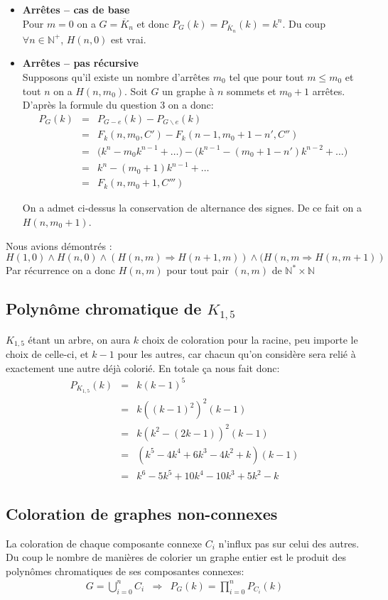 \begin{itemize}
\item \textbf{Arrêtes -- cas de base} \\
Pour $m = 0$ on a $G = \overline{K}_n$ et donc $P_G(k) = P_{\overline{K}_n}(k) = k^n$. Du coup $\forall n \in \mathbb{N^+}$, $H(n,0)$ est vrai.
\item \textbf{Arrêtes -- pas récursive} \\
Supposons qu'il existe un nombre d'arrêtes $m_0$ tel que pour tout $m \leq m_0$ et tout $n$ on a $H(n,m_0)$. Soit $G$ un graphe à $n$ sommets et $m_0 + 1$ arrêtes. D'après la formule du question $3$ on a donc:
\begin{eqnarray*}
P_G(k) &=& P_{G-e}(k) - P_{G \backslash e}(k)	\\
		&=& F_k(n,m_0,C') - F_k(n-1,m_0+1-n',C'')	\\
		&=& \Big( k^n - m_0k^{n-1} + \ldots \Big) - \Big( k^{n-1} - (m_0+1-n')k^{n-2} + \ldots \Big) 	\\
		&=& k^n - (m_0+1)k^{n-1} + \ldots	\\
		&=& F_k(n, m_0+1, C''')									
\end{eqnarray*}

On a admet ci-dessus la conservation de alternance des signes. De ce fait on a $H(n,m_0+1)$.
\end {itemize}
Nous avions démontrés :
\[ H(1,0) \wedge H(n,0) \wedge (H(n,m) \Rightarrow H(n+1,m)) \wedge (H(n,m \Rightarrow H(n,m+1)) \]
Par récurrence on a donc $H(n,m)$ pour tout pair $(n,m)$ de $\mathbb{N}^*\times{\mathbb{N}}$

\subsection{Polynôme chromatique de $K_{1,5}$}
$K_{1,5}$ étant un arbre, on aura $k$ choix de coloration pour la racine, peu importe le choix de celle-ci, et $k-1$ pour les autres, car chacun qu'on considère sera relié à exactement une autre déjà colorié. En totale ça nous fait donc:
\begin{eqnarray*}
P_{K_{1,5}}(k) 	& = & k(k-1)^5 \\
				& = & k{((k-1)^2)}^2(k-1)	\\
				& = & k(k^2 - (2k - 1))^2(k-1)	\\
				& = & (k^5 - 4k^4  + 6k^3 - 4k^2 + k)(k-1)  \\
				& = & k^6 - 5k^5  + 10k^4 - 10k^3 + 5k^2 - k	 
\end{eqnarray*}

\subsection{Coloration de graphes non-connexes}
La coloration de chaque composante connexe $C_i$ n'influx pas sur celui des autres. Du coup le nombre de manières de colorier un graphe entier est le produit des polynômes chromatiques de ses composantes connexes:
\begin{eqnarray*}
G = \bigcup_{i=0}^n C_i & \Rightarrow & P_G(k)=\prod_{i=0}^n P_{C_i}(k) \\
\end{eqnarray*}

